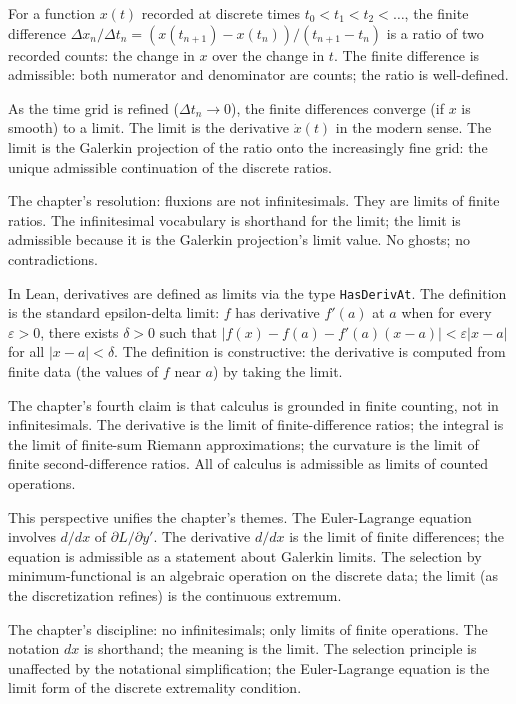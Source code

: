 For a function $x(t)$ recorded at discrete times $t_0 < t_1 < t_2 <
\ldots$, the finite difference $\Delta x_n / \Delta t_n =
(x(t_{n+1}) - x(t_n))/(t_{n+1} - t_n)$ is a ratio of two recorded
counts: the change in $x$ over the change in $t$. The finite
difference is admissible: both numerator and denominator are
counts; the ratio is well-defined.

As the time grid is refined ($\Delta t_n \to 0$), the finite
differences converge (if $x$ is smooth) to a limit. The limit is
the derivative $\dot{x}(t)$ in the modern sense. The limit is the
Galerkin projection of the ratio onto the increasingly fine grid:
the unique admissible continuation of the discrete ratios.

The chapter's resolution: fluxions are not infinitesimals. They are
limits of finite ratios. The infinitesimal vocabulary is shorthand
for the limit; the limit is admissible because it is the Galerkin
projection's limit value. No ghosts; no contradictions.

In Lean, derivatives are defined as limits via the type
\texttt{HasDerivAt}. The definition is the standard
epsilon-delta limit: $f$ has derivative $f'(a)$ at $a$ when for
every $\varepsilon > 0$, there exists $\delta > 0$ such that
$|f(x) - f(a) - f'(a)(x - a)| < \varepsilon |x - a|$ for all $|x
- a| < \delta$. The definition is constructive: the derivative is
computed from finite data (the values of $f$ near $a$) by taking
the limit.

The chapter's fourth claim is that calculus is grounded in finite
counting, not in infinitesimals. The derivative is the limit of
finite-difference ratios; the integral is the limit of
finite-sum Riemann approximations; the curvature is the limit of
finite second-difference ratios. All of calculus is admissible as
limits of counted operations.

This perspective unifies the chapter's themes. The Euler-Lagrange
equation involves $d/dx$ of $\partial L/\partial y'$. The
derivative $d/dx$ is the limit of finite differences; the
equation is admissible as a statement about Galerkin limits. The
selection by minimum-functional is an algebraic operation on the
discrete data; the limit (as the discretization refines) is the
continuous extremum.

The chapter's discipline: no infinitesimals; only limits of
finite operations. The notation $dx$ is shorthand; the meaning is
the limit. The selection principle is unaffected by the
notational simplification; the Euler-Lagrange equation is the
limit form of the discrete extremality condition.

